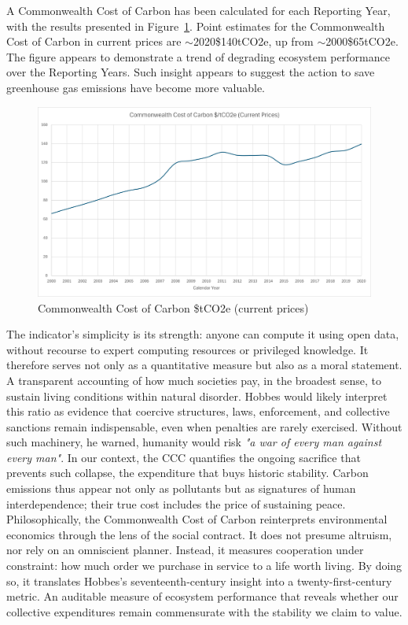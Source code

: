 A Commonwealth Cost of Carbon has been calculated for each Reporting Year, with the results presented in Figure~\ref{CCC figure}.
Point estimates for the Commonwealth Cost of Carbon in current prices are $\sim$2020\$140tCO2e, up from $\sim$2000\$65tCO2e.
The figure appears to demonstrate a trend of degrading ecosystem performance over the Reporting Years.
Such insight appears to suggest the action to save greenhouse gas emissions have become more valuable.\\

\begin{figure}[H]
\centering
\includegraphics[width=1\textwidth]{ccc}
\caption{Commonwealth Cost of Carbon \$tCO2e (current prices)}
\label{CCC figure}
\end{figure}

The indicator’s simplicity is its strength: anyone can compute it using open data, without recourse to expert computing resources or privileged knowledge.
It therefore serves not only as a quantitative measure but also as a moral statement.
A transparent accounting of how much societies pay, in the broadest sense, to sustain living conditions within natural disorder.
Hobbes would likely interpret this ratio as evidence that coercive structures, laws, enforcement, and collective sanctions remain indispensable, even when penalties are rarely exercised.
Without such machinery, he warned, humanity would risk \emph{"a war of every man against every man"}.
In our context, the CCC quantifies the ongoing sacrifice that prevents such collapse, the expenditure that buys historic stability.
Carbon emissions thus appear not only as pollutants but as signatures of human interdependence; their true cost includes the price of sustaining peace.
Philosophically, the Commonwealth Cost of Carbon reinterprets environmental economics through the lens of the social contract.
It does not presume altruism, nor rely on an omniscient planner.
Instead, it measures cooperation under constraint: how much order we purchase in service to a life worth living.
By doing so, it translates Hobbes’s seventeenth-century insight into a twenty-first-century metric.
An auditable measure of ecosystem performance that reveals whether our collective expenditures remain commensurate with the stability we claim to value.\\

